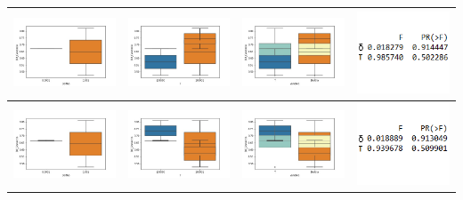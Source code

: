 \begin{table}[H]
\begin{tabular}[c]{llll}
\multicolumn{1}{|l|}{\includegraphics[align=t, width=33mm]{cajasDeltha_exp22.jpg}}    & \multicolumn{1}{l|}{\includegraphics[align=t, width=33mm]{cajasT1_exp22.jpg} } & \multicolumn{1}{l|}{\includegraphics[align=t, width=33mm]{cajasT_Deltha_exp22.jpg} } & \multicolumn{1}{p{3cm}|}{\includegraphics[align=t, width=30mm]{Anova22.png}} \\ \hline
\multicolumn{1}{|l|}{\includegraphics[align=t, width=33mm]{cajasDeltha_exp23.jpg}}    & \multicolumn{1}{l|}{\includegraphics[align=t, width=33mm]{cajasT1_exp23.jpg} } & \multicolumn{1}{l|}{\includegraphics[align=t, width=33mm]{cajasT_Deltha_exp23.jpg} } & \multicolumn{1}{p{3cm}|}{\includegraphics[align=t, width=30mm]{Anova23.png}} \\ \hline
\end{tabular}
\label{exp2}
\end{table}


